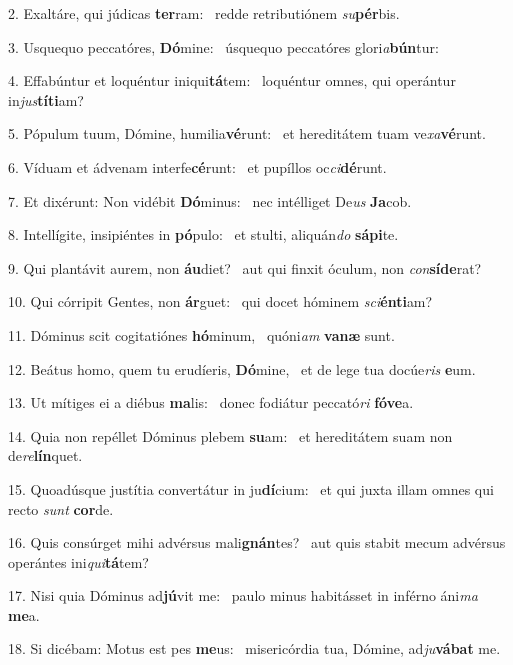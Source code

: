 2. Exaltáre, qui júdicas \textbf{ter}ram: \ast\  redde retributiónem \textit{su}\textbf{pér}bis.\

3. Usquequo peccatóres, \textbf{Dó}mine: \ast\  úsquequo peccatóres glori\textit{a}\textbf{bún}tur:\

4. Effabúntur et loquéntur iniqui\textbf{tá}tem: \ast\  loquéntur omnes, qui operántur in\textit{jus}\textbf{tí}\textbf{ti}am?\

5. Pópulum tuum, Dómine, humilia\textbf{vé}runt: \ast\  et hereditátem tuam ve\textit{xa}\textbf{vé}runt.\

6. Víduam et ádvenam interfe\textbf{cé}runt: \ast\  et pupíllos oc\textit{ci}\textbf{dé}runt.\

7. Et dixérunt: Non vidébit \textbf{Dó}minus: \ast\  nec intélliget De\textit{us} \textbf{Ja}cob.\

8. Intellígite, insipiéntes in \textbf{pó}pulo: \ast\  et stulti, aliquán\textit{do} \textbf{sá}\textbf{pi}te.\

9. Qui plantávit aurem, non \textbf{áu}diet? \ast\  aut qui finxit óculum, non \textit{con}\textbf{sí}\textbf{de}rat?\

10. Qui córripit Gentes, non \textbf{ár}guet: \ast\  qui docet hóminem \textit{sci}\textbf{én}\textbf{ti}am?\

11. Dóminus scit cogitatiónes \textbf{hó}minum, \ast\  quóni\textit{am} \textbf{va}\textbf{næ} sunt.\

12. Beátus homo, quem tu erudíeris, \textbf{Dó}mine, \ast\  et de lege tua docúe\textit{ris} \textbf{e}um.\

13. Ut mítiges ei a diébus \textbf{ma}lis: \ast\  donec fodiátur peccató\textit{ri} \textbf{fó}\textbf{ve}a.\

14. Quia non repéllet Dóminus plebem \textbf{su}am: \ast\  et hereditátem suam non de\textit{re}\textbf{lín}quet.\

15. Quoadúsque justítia convertátur in ju\textbf{dí}cium: \ast\  et qui juxta illam omnes qui recto \textit{sunt} \textbf{cor}de.\

16. Quis consúrget mihi advérsus mali\textbf{gnán}tes? \ast\  aut quis stabit mecum advérsus operántes ini\textit{qui}\textbf{tá}tem?\

17. Nisi quia Dóminus ad\textbf{jú}vit me: \ast\  paulo minus habitásset in inférno áni\textit{ma} \textbf{me}a.\

18. Si dicébam: Motus est pes \textbf{me}us: \ast\  misericórdia tua, Dómine, ad\textit{ju}\textbf{vá}\textbf{bat} me.\

